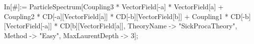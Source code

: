 In[\#]:= ParticleSpectrum[Coupling3 * VectorField[-a] * VectorField[a] + Coupling2 * CD[-a][VectorField[a]] * CD[-b][VectorField[b]] + Coupling1 * CD[-b][VectorField[-a]] * CD[b][VectorField[a]], TheoryName -> "SickProcaTheory", Method -> "Easy", MaxLaurentDepth -> 3]; 